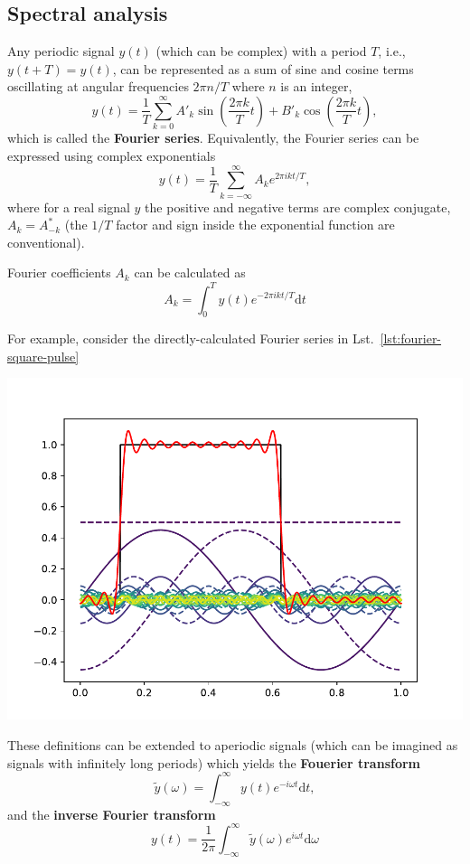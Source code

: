 \subsection{Spectral analysis}
Any periodic signal $y(t)$ (which can be complex) with a period $T$, i.e., $y(t + T) = y(t)$, can be represented as a sum of sine and cosine terms oscillating at angular frequencies $2\pi n/T$ where $n$ is an integer,
\begin{equation}
    y(t) = \frac{1}{T} \sum_{k=0}^{\infty} A'_k\sin\left(\frac{2\pi k}{T}t\right) + B'_k\cos\left(\frac{2\pi k}{T}t\right),
\end{equation}
which is called the \textbf{Fourier series}. Equivalently, the Fourier series can be expressed using complex exponentials
\begin{equation}
    y(t) = \frac{1}{T} \sum_{k=-\infty}^\infty A_k e^{2\pi ikt/T},
\end{equation}
where for a real signal $y$ the positive and negative terms are complex conjugate, $A_k = A_{-k}^*$ (the $1/T$ factor and sign inside the exponential function are conventional).

Fourier coefficients $A_k$ can be calculated as
\begin{equation}
    A_k = \int_0^T y(t) e^{-2\pi ikt/T} \mathrm{d}t
\end{equation}

For example, consider the directly-calculated Fourier series in Lst.~\ref{lst:fourier-square-pulse}

\begin{center}
    \includegraphics[width=0.5\linewidth]{fourier_series_square_pulse.pdf}
\end{center}

These definitions can be extended to aperiodic signals (which can be imagined as signals with infinitely long periods) which yields the \textbf{Fouerier transform}
\begin{equation}
    \tilde y(\omega) = \int_{-\infty}^\infty y(t)e^{-i\omega t} \mathrm{d}t,
\end{equation}
and the \textbf{inverse Fourier transform}
\begin{equation}
    y(t) = \frac{1}{2\pi}\int_{-\infty}^\infty \tilde y (\omega)e^{i\omega t}\mathrm{d}\omega
\end{equation}


